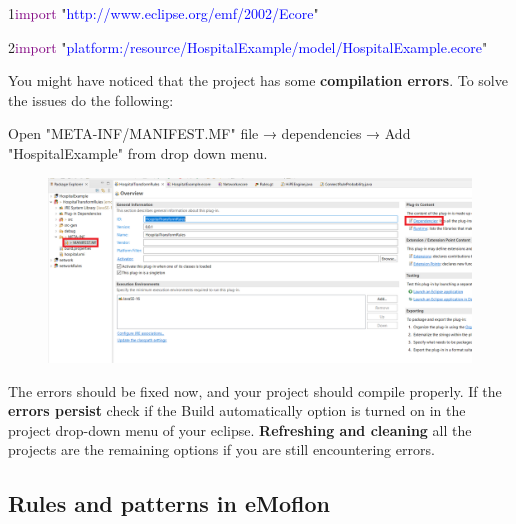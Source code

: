 {

1\hspace{0.5cm}\textcolor{Purple}{import} "\textcolor{Blue}{http://www.eclipse.org/emf/2002/Ecore}"

2\hspace{0.5cm}\textcolor{Purple}{import} "\textcolor{Blue}{platform:/resource/HospitalExample/model/HospitalExample.ecore}"\newline

}

You might have noticed that the project has some \textbf{compilation errors}. To solve the issues do the following:\newline\newline

\centering

Open \textsf{"META-INF/MANIFEST.MF"} file → \textsf{dependencies} → Add \textsf{"HospitalExample"} from drop down menu.\newline\newline

\begin{figure}[h]
    \centering
    \includegraphics[scale=0.7, width= \textwidth]{pictures/manifest.png}
    \caption{}
    \label{manifest}
\end{figure}

\raggedright

The errors should be fixed now, and your project should compile properly. If the \textbf{errors persist} check if the Build automatically option is turned on in the project drop-down menu of your eclipse. \textbf{Refreshing and cleaning} all the projects are the remaining options if you are still encountering errors.

\raggedright

\clearpage
\subsection{Rules and patterns in eMoflon}

